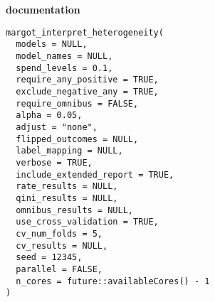 \documentclass[a4paper]{book}
\begin{document}
\chapter*{}
\begin{center}
{\textbf{\huge \R{} documentation}} \par{}
\par\bigskip{\large \today}
\end{center}
%
\begin{Usage}
\begin{verbatim}
margot_interpret_heterogeneity(
  models = NULL,
  model_names = NULL,
  spend_levels = 0.1,
  require_any_positive = TRUE,
  exclude_negative_any = TRUE,
  require_omnibus = FALSE,
  alpha = 0.05,
  adjust = "none",
  flipped_outcomes = NULL,
  label_mapping = NULL,
  verbose = TRUE,
  include_extended_report = TRUE,
  rate_results = NULL,
  qini_results = NULL,
  omnibus_results = NULL,
  use_cross_validation = TRUE,
  cv_num_folds = 5,
  cv_results = NULL,
  seed = 12345,
  parallel = FALSE,
  n_cores = future::availableCores() - 1
)
\end{verbatim}
\end{Usage}
%
\end{document}
